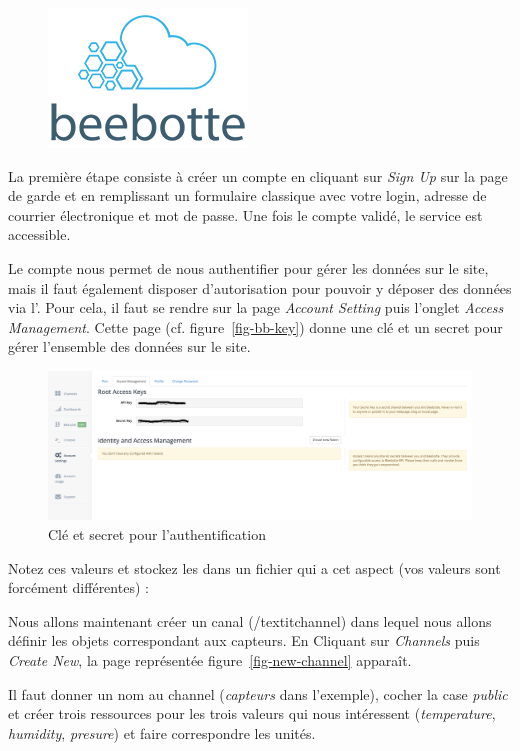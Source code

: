 \begin{figure}
\includegraphics[width=.2\columnwidth]{Pictures/beebotte.png}
\end{figure}

La première étape consiste à créer un compte en cliquant sur \textit{Sign Up} sur la page de garde et en remplissant un formulaire classique avec votre login, adresse de courrier électronique et mot de passe. Une fois le compte validé, le service est accessible.

Le compte nous permet de nous authentifier pour gérer les données sur le site, mais il faut également disposer d’autorisation pour pouvoir y déposer des données via l’.
Pour cela, il faut se rendre sur la page \textit{Account Setting} puis l’onglet \textit{Access Management}. 
Cette page (cf. figure~\vref{fig-bb-key}) donne une clé et un secret pour gérer l’ensemble des données sur le site. 

\begin{figure}[tbp]
\centerline{\includegraphics[width=1\columnwidth]{Pictures/bb_root_token.png}}
\caption{Clé et secret pour l'authentification}
\label{fig-bb-key}
\end{figure}


Notez ces valeurs et stockez les dans un fichier  qui a cet aspect (vos valeurs sont forcément différentes) :





Nous allons maintenant créer un canal (/textit{channel}) dans lequel nous allons définir les objets correspondant aux capteurs. En Cliquant sur \textit {Channels} puis \textit{Create New}, la page représentée figure~\vref{fig-new-channel} apparaît. 

Il faut donner un nom au channel (\textit{capteurs} dans l'exemple), cocher la case \textit{public} et créer trois ressources pour les trois valeurs qui nous intéressent (\textit{temperature}, \textit{humidity}, \textit{presure}) et faire correspondre les unités.



